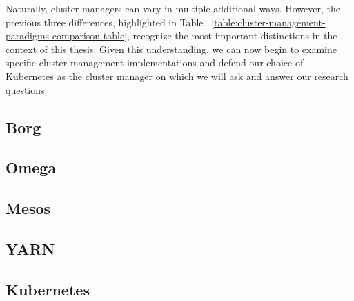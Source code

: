 Naturally, cluster managers can vary in multiple additional ways. However,
the previous three differences, highlighted in Table
~\ref{table:cluster-management-paradigms-comparison-table}, recognize the most important distinctions in
the context of this thesis. Given this understanding, we can now begin to examine specific
cluster management implementations and defend our choice of Kubernetes as the
cluster manager on which we will ask and answer our research questions.

\subsection{Borg}



\subsection{Omega}





\subsection{Mesos}



\subsection{YARN}



\subsection{Kubernetes}


